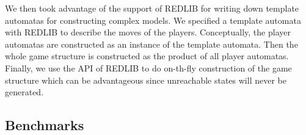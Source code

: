 \documentclass[times,10pt,twocolumn]{article}
\begin{document}
\label{reply1.due.to.huge}
We then took advantage of the support of REDLIB for writing down 
template automatas for constructing complex models. 
We specified a template automata with REDLIB to describe the moves of the players. 
Conceptually, the player automatas are constructed as an instance of the template automata. 
Then the whole game structure is constructed as the product of all player automatas. 
Finally, we use the API of REDLIB to do on-th-fly construction of the game structure which 
can be advantageous since unreachable states will never be generated.  



\subsection{Benchmarks \label{subsec.bench}} 
\end{document}
